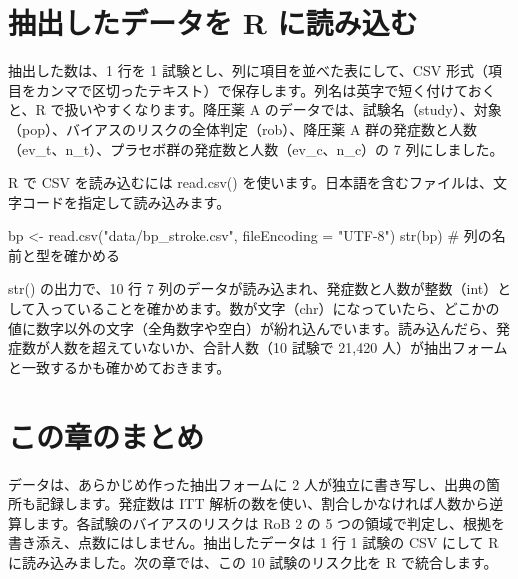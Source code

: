 \section{抽出したデータを R に読み込む}
\label{sec:04-4}

抽出した数は、1 行を 1 試験とし、列に項目を並べた表にして、CSV 形式（項目をカンマで区切ったテキスト）で保存します。列名は英字で短く付けておくと、R で扱いやすくなります。降圧薬 A のデータでは、試験名（study）、対象（pop）、バイアスのリスクの全体判定（rob）、降圧薬 A 群の発症数と人数（ev\_t、n\_t）、プラセボ群の発症数と人数（ev\_c、n\_c）の 7 列にしました。

R で CSV を読み込むには read.csv() を使います。日本語を含むファイルは、文字コードを指定して読み込みます。

\begin{rcode}
bp <- read.csv("data/bp_stroke.csv",
               fileEncoding = "UTF-8")
str(bp)    # 列の名前と型を確かめる
\end{rcode}


str() の出力で、10 行 7 列のデータが読み込まれ、発症数と人数が整数（int）として入っていることを確かめます。数が文字（chr）になっていたら、どこかの値に数字以外の文字（全角数字や空白）が紛れ込んでいます。読み込んだら、発症数が人数を超えていないか、合計人数（10 試験で 21,420 人）が抽出フォームと一致するかも確かめておきます。

\section{この章のまとめ}
\label{sec:04-5}

データは、あらかじめ作った抽出フォームに 2 人が独立に書き写し、出典の箇所も記録します。発症数は ITT 解析の数を使い、割合しかなければ人数から逆算します。各試験のバイアスのリスクは RoB 2 の 5 つの領域で判定し、根拠を書き添え、点数にはしません。抽出したデータは 1 行 1 試験の CSV にして R に読み込みました。次の章では、この 10 試験のリスク比を R で統合します。
